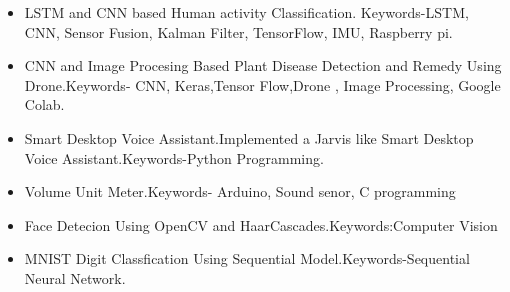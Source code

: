 \documentclass[10pt,a4paper,ragged2e]{altacv}
\begin{document}
\divider




\begin{itemize}
    \item LSTM and CNN based Human activity Classification. Keywords-LSTM, CNN, Sensor Fusion, Kalman Filter, TensorFlow, IMU, Raspberry pi.
    \item CNN and Image Procesing Based Plant Disease Detection and Remedy Using Drone.Keywords- CNN, Keras,Tensor Flow,Drone , Image Processing, Google Colab.
    \item Smart Desktop Voice Assistant.Implemented a Jarvis like Smart Desktop Voice Assistant.Keywords-Python Programming.
    \item Volume Unit Meter.Keywords- Arduino, Sound senor, C programming
    \item Face Detecion Using OpenCV and HaarCascades.Keywords:Computer Vision
    \item MNIST Digit Classfication Using Sequential Model.Keywords-Sequential Neural Network.
    
    
    
\end{itemize}
\end{document}
